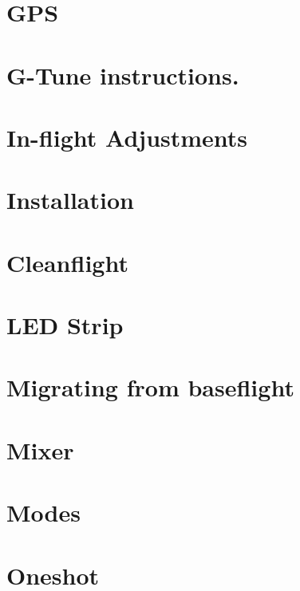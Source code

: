\documentclass[twoside]{book}
\newcommand{\+}{\discretionary{\mbox{\scriptsize$\hookleftarrow$}}{}{}}
\begin{document}
\chapter{G\+P\+S}
\label{md_docs_Gps}
\hypertarget{md_docs_Gps}{}

\chapter{G-\/\+Tune instructions.}
\label{md_docs_Gtune}
\hypertarget{md_docs_Gtune}{}

\chapter{In-\/flight Adjustments}
\label{md_docs_Inflight_Adjustments}
\hypertarget{md_docs_Inflight_Adjustments}{}

\chapter{Installation}
\label{md_docs_Installation}
\hypertarget{md_docs_Installation}{}

\chapter{Cleanflight}
\label{md_docs_Introduction}
\hypertarget{md_docs_Introduction}{}

\chapter{L\+E\+D Strip}
\label{md_docs_LedStrip}
\hypertarget{md_docs_LedStrip}{}

\chapter{Migrating from baseflight}
\label{md_docs_Migrating_from_baseflight}
\hypertarget{md_docs_Migrating_from_baseflight}{}

\chapter{Mixer}
\label{md_docs_Mixer}
\hypertarget{md_docs_Mixer}{}

\chapter{Modes}
\label{md_docs_Modes}
\hypertarget{md_docs_Modes}{}

\chapter{Oneshot}
\label{md_docs_Oneshot}
\hypertarget{md_docs_Oneshot}{}

\end{document}
